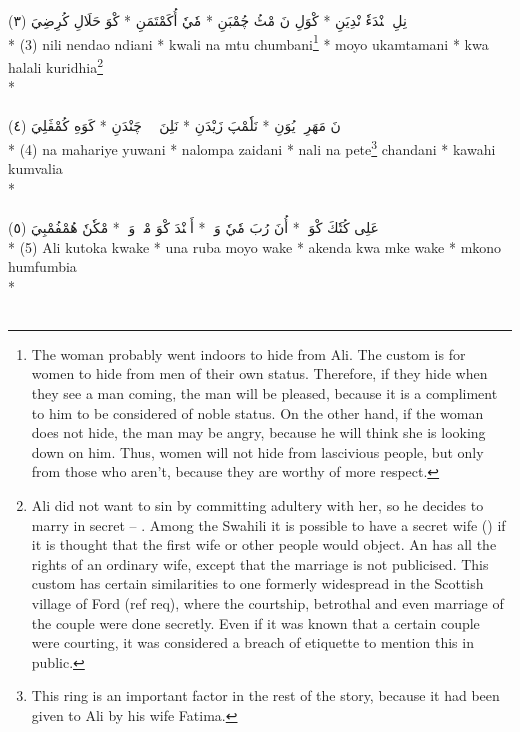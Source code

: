 \documentclass[a4paper, 12pt]{report}
\begin{document}
\begin{center}
\textarabic{(٣) \textcolor{mygreen}{نِلِ نٖنْدَءٗ نْدِيَنِ  * كْوَلِ نَ مْٹُ چُمْبَنِ  * مٗيٗ أُكَمْتَمَنِ  * كْوَ حَلَالِ كُرِضِيَ }} \\* 
(3) nili nendao ndiani  * kwali na mtu chumbani\footnote{The woman probably went indoors to hide from Ali.  The custom is for  women to hide from men of their own status.  Therefore, if they hide when they see a man coming, the man will be pleased, because it is a compliment to him to be considered of noble status.  On the other hand, if the woman does not hide, the man may be angry, because he will think she is looking down on him. Thus, women will not hide from lascivious people, but only from those who aren't, because they are worthy of more respect.}   * moyo ukamtamani  * kwa halali kuridhia\footnote{Ali did not want to sin by committing adultery with her, so he decides to marry in secret -- .  Among the Swahili it is possible to have a secret wife () if it is thought that the first wife or other people would object.  An  has all the rights of an ordinary wife, except that the marriage is not publicised.  This custom has certain similarities to one formerly widespread in the Scottish village of Ford (ref req), where the courtship, betrothal and even marriage of the couple were done secretly.  Even if it was known that a certain couple were courting, it was considered a breach of etiquette to mention this in public.}   \\* 
 \\ 
\\[8mm] 

\textarabic{(٤) \textcolor{mygreen}{نَ مَهَرِيٖ يُوَنِ  * نَلٗمْپَ زَيْدَنِ  * نَلِنَ پٖٹٖ چَنْدَنِ  * كَوَهِ كُمْڤَلِيَ }} \\* 
(4) na mahariye yuwani  * nalompa zaidani  * nali na pete\footnote{This ring is an important factor in the rest of the story, because it had been given to Ali by his wife Fatima.}  chandani  * kawahi kumvalia  \\* 
 \\ 
\\[8mm] 

\textarabic{(٥) \textcolor{mygreen}{عَلِى كُتٗكَ كْوَكٖ  * أُنَ رُبَ مٗيٗ وَكٖ  * أَكٖنْدَ كْوَ مْكٖ وَكٖ  * مْكٗنٗ هُمْفُمْبِيَ }} \\* 
(5) Ali kutoka kwake  * una ruba moyo wake  * akenda kwa mke wake  * mkono humfumbia  \\* 
 \\ 
\\[8mm] 


\end{center}
\end{document}
